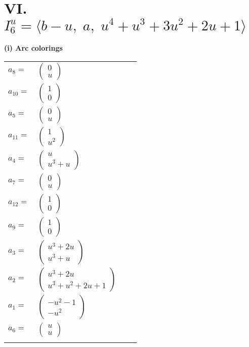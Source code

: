 \documentclass[1p]{elsarticle_modified}
\theoremstyle{definition}
\begin{document}
\centering \section*{VI. $I^u_{6}= \langle b- u,\;a,\;u^4+u^3+3 u^2+2 u+1 \rangle$}
\flushleft \textbf{(i) Arc colorings}\\
\begin{tabular}{m{7pt} m{180pt} m{7pt} m{180pt} }
\flushright $a_{8}=$&$\begin{pmatrix}0\\u\end{pmatrix}$ \\
\flushright $a_{10}=$&$\begin{pmatrix}1\\0\end{pmatrix}$ \\
\flushright $a_{5}=$&$\begin{pmatrix}0\\u\end{pmatrix}$ \\
\flushright $a_{11}=$&$\begin{pmatrix}1\\u^2\end{pmatrix}$ \\
\flushright $a_{4}=$&$\begin{pmatrix}u\\u^3+u\end{pmatrix}$ \\
\flushright $a_{7}=$&$\begin{pmatrix}0\\u\end{pmatrix}$ \\
\flushright $a_{12}=$&$\begin{pmatrix}1\\0\end{pmatrix}$ \\
\flushright $a_{9}=$&$\begin{pmatrix}1\\0\end{pmatrix}$ \\
\flushright $a_{3}=$&$\begin{pmatrix}u^3+2 u\\u^3+u\end{pmatrix}$ \\
\flushright $a_{2}=$&$\begin{pmatrix}u^3+2 u\\u^3+u^2+2 u+1\end{pmatrix}$ \\
\flushright $a_{1}=$&$\begin{pmatrix}- u^2-1\\- u^2\end{pmatrix}$ \\
\flushright $a_{6}=$&$\begin{pmatrix}u\\u\end{pmatrix}$\\&\end{tabular}
\end{document}
